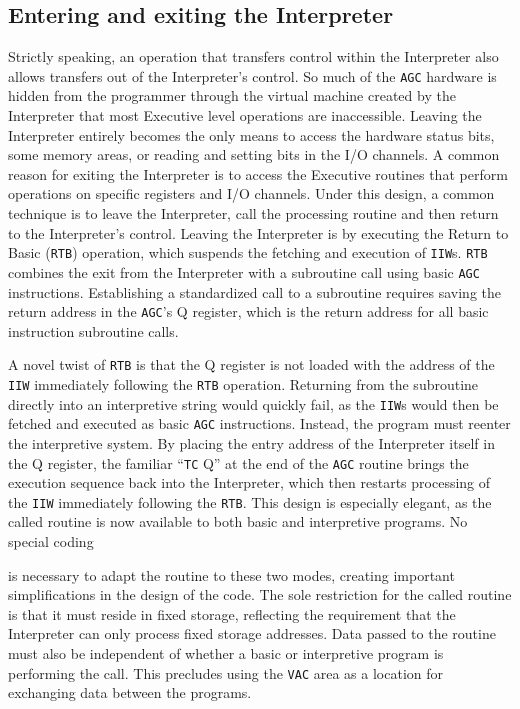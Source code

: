 \documentclass[refcap, oxford]{ahsan}
\begin{document}
\subsection{Entering and exiting the Interpreter}
Strictly speaking, an operation that transfers control within the Interpreter also allows transfers out of the Interpreter's control. So much of the \texttt{AGC} hardware is hidden from the programmer through the virtual machine created by the Interpreter that most Executive level operations are inaccessible. Leaving the Interpreter entirely becomes the only means to access the hardware status bits, some memory areas, or reading and setting bits in the I/O channels. A common reason for exiting the Interpreter is to access the Executive routines that perform operations on specific registers and I/O channels. Under this design, a common technique is to leave the Interpreter, call the processing routine and then return to the Interpreter's control. Leaving the Interpreter is by executing the Return to Basic (\texttt{RTB}) operation, which suspends the fetching and execution of \texttt{IIW}s. \texttt{RTB} combines the exit from the Interpreter with a subroutine call using basic \texttt{AGC} instructions. Establishing a standardized call to a subroutine requires saving the return address in the \texttt{AGC}'s Q register, which is the return address for all basic instruction subroutine calls.

A novel twist of \texttt{RTB} is that the Q register is not loaded with the address of the \texttt{IIW} immediately following the \texttt{RTB} operation. Returning from the subroutine directly into an interpretive string would quickly fail, as the \texttt{IIW}s would then be fetched and executed as basic \texttt{AGC} instructions. Instead, the program must reenter the interpretive system. By placing the entry address of the Interpreter itself in the Q register, the familiar ``\texttt{TC} Q'' at the end of the \texttt{AGC} routine brings the execution sequence back into the Interpreter, which then restarts processing of the \texttt{IIW} immediately following the \texttt{RTB}. This design is especially elegant, as the called routine is now available to both basic and interpretive programs. No special coding


is necessary to adapt the routine to these two modes, creating important
simplifications in the design of the code. The sole restriction for the called routine
is that it must reside in fixed storage, reflecting the requirement that the
Interpreter can only process fixed storage addresses. Data passed to the routine must
also be independent of whether a basic or interpretive program is performing the call.
This precludes using the \texttt{VAC} area as a location for exchanging data between the
programs.
\end{document}

